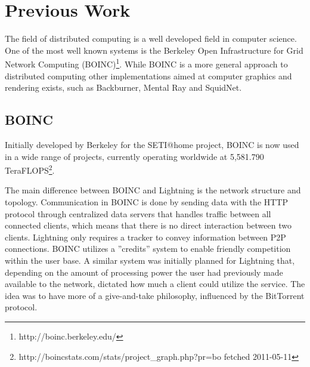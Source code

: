 \chapter{Previous Work}
The field of distributed computing is a well developed field in computer
science. One of the most well known systems is the Berkeley Open Infrastructure
for Grid Network Computing (BOINC)\footnote{http://boinc.berkeley.edu/}.
While BOINC is a more general approach to distributed computing other 
implementations aimed at computer graphics and rendering exists, such as Backburner, Mental Ray and SquidNet.


\section{BOINC}
Initially developed by Berkeley for the SETI@home project, BOINC is now used in
a wide range of projects, currently operating worldwide at 5,581.790 
TeraFLOPS\footnote{http://boincstats.com/stats/project\_graph.php?pr=bo 
fetched 2011-05-11}.

The main difference between BOINC and Lightning is the network structure and topology.
Communication in BOINC is done by sending data with the HTTP protocol through centralized data
servers that handles traffic between all connected clients, which means 
that there is no direct interaction between two clients. Lightning only
requires a tracker to convey information between P2P connections.
BOINC utilizes a ''credits'' system to enable friendly competition within the user base.
A similar system was initially planned for Lightning that, depending on the amount of processing power the user had previously
made available to the network, dictated how much a client could utilize the service. The idea was to have more of a give-and-take philosophy, influenced by the BitTorrent protocol.


